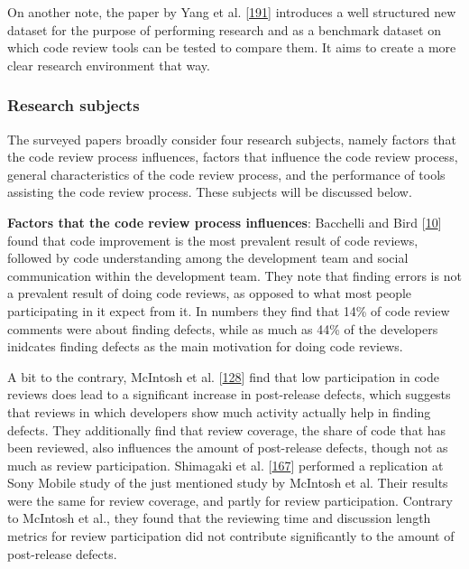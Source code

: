 \documentclass[]{book}
\begin{document}
On another note, the paper by Yang et al.
{[}\protect\hyperlink{ref-yang2016mining}{191}{]} introduces a well
structured new dataset for the purpose of performing research and as a
benchmark dataset on which code review tools can be tested to compare
them. It aims to create a more clear research environment that way.

\subsubsection{Research subjects}\label{research-subjects}

The surveyed papers broadly consider four research subjects, namely
factors that the code review process influences, factors that influence
the code review process, general characteristics of the code review
process, and the performance of tools assisting the code review process.
These subjects will be discussed below.

\textbf{Factors that the code review process influences}: Bacchelli and
Bird {[}\protect\hyperlink{ref-bacchelli2013expectations}{10}{]} found
that code improvement is the most prevalent result of code reviews,
followed by code understanding among the development team and social
communication within the development team. They note that finding errors
is not a prevalent result of doing code reviews, as opposed to what most
people participating in it expect from it. In numbers they find that
14\% of code review comments were about finding defects, while as much
as 44\% of the developers inidcates finding defects as the main
motivation for doing code reviews.

A bit to the contrary, McIntosh et al.
{[}\protect\hyperlink{ref-mcintosh2014impact}{128}{]} find that low
participation in code reviews does lead to a significant increase in
post-release defects, which suggests that reviews in which developers
show much activity actually help in finding defects. They additionally
find that review coverage, the share of code that has been reviewed,
also influences the amount of post-release defects, though not as much
as review participation. Shimagaki et al.
{[}\protect\hyperlink{ref-shimagaki2016study}{167}{]} performed a
replication at Sony Mobile study of the just mentioned study by McIntosh
et al. Their results were the same for review coverage, and partly for
review participation. Contrary to McIntosh et al., they found that the
reviewing time and discussion length metrics for review participation
did not contribute significantly to the amount of post-release defects.
\end{document}
